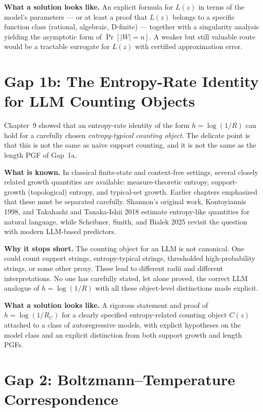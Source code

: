 \textbf{What a solution looks like.} An explicit formula for $L(z)$ in terms of the model's parameters --- or at least a proof that $L(z)$ belongs to a specific function class (rational, algebraic, D-finite) --- together with a singularity analysis yielding the asymptotic form of $\Pr[|W|=n]$. A weaker but still valuable route would be a tractable surrogate for $L(z)$ with certified approximation error.

\section{Gap 1b: The Entropy-Rate Identity for LLM Counting Objects}
\label{ch18:gap1b}

Chapter~9 showed that an entropy-rate identity of the form $h=\log(1/R)$ can hold for a carefully chosen \emph{entropy-typical counting object}. The delicate point is that this is not the same as naive support counting, and it is not the same as the length PGF of Gap~1a.

\textbf{What is known.} In classical finite-state and context-free settings, several closely related growth quantities are available: measure-theoretic entropy, support-growth (topological) entropy, and typical-set growth. Earlier chapters emphasized that these must be separated carefully. Shannon's original work, Kontoyiannis 1998, and Takahashi and Tanaka-Ishii 2018 \cite{TakahashiTanakaIshii2018} estimate entropy-like quantities for natural language, while Scheibner, Smith, and Bialek 2025 \cite{ScheibnerSmithBialek2025} revisit the question with modern LLM-based predictors.

\textbf{Why it stops short.} The counting object for an LLM is not canonical. One could count support strings, entropy-typical strings, thresholded high-probability strings, or some other proxy. These lead to different radii and different interpretations. No one has carefully stated, let alone proved, the correct LLM analogue of $h=\log(1/R)$ with all these object-level distinctions made explicit.

\textbf{What a solution looks like.} A rigorous statement and proof of $h=\log(1/R_C)$ for a clearly specified entropy-related counting object $C(z)$ attached to a class of autoregressive models, with explicit hypotheses on the model class and an explicit distinction from both support growth and length PGFs.

\section{Gap 2: Boltzmann--Temperature Correspondence}
\label{ch18:gap2}

